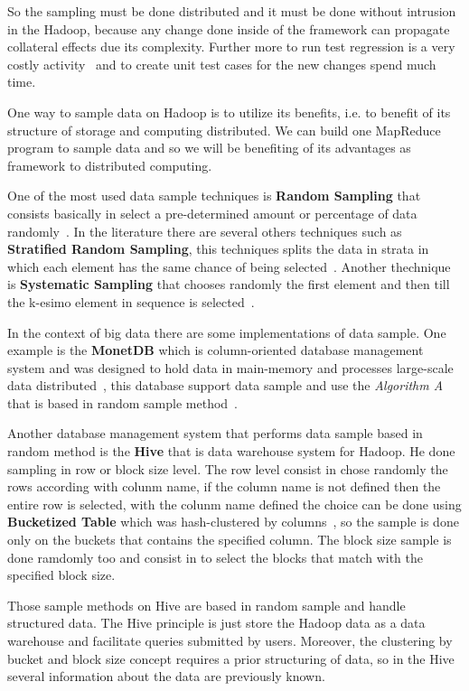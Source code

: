 So the sampling must be done distributed and it must be done without intrusion
in the Hadoop, because any change done inside of the framework can propagate collateral
effects due its complexity. Further more to run test regression is a very costly
activity~\cite{hadoopUnit} and to create unit test cases for the new changes spend
much time.

One way to sample data on Hadoop is to utilize its benefits, i.e. to benefit of
its structure of storage and computing distributed. We can build one MapReduce
program to sample data and so we will be benefiting of its advantages as framework
to distributed computing.

One of the most used data sample techniques is {\bf Random Sampling} that consists
basically in select a pre-determined amount or percentage of data randomly~\cite{randomsampling}.
In the literature there are several others techniques such as {\bf Stratified Random Sampling},
this techniques splits the data in strata in which each element has the same chance
of being selected~\cite{randomsampling}. Another thechnique is {\bf Systematic Sampling}
that chooses randomly the first element and then till the k-esimo element in sequence
is selected~\cite{systematicsampling}.

In the context of big data there are some implementations of data sample. One example
is the {\bf MonetDB} which is column-oriented database management system and was
designed to hold data in main-memory and processes large-scale data distributed~\cite{monetDB},
this database support data sample and use the {\it Algorithm A} that is based in
random sample method~\cite{vitter:1984}.

Another database management system that performs data sample based in random method
is the {\bf Hive} that is data warehouse system for Hadoop. He done sampling in
row or block size level. The row level consist in chose randomly the rows
according with colunm name, if the column name is not defined then the entire row
is selected, with the colunm name defined the choice can be done using
{\bf Bucketized Table} which was hash-clustered by columns~\cite{hiveSample},
so the sample is done only on the buckets that contains the specified column. 
The block size sample is done ramdomly too and consist in to select the blocks that
match with the specified block size.

Those sample methods on Hive are based in random sample and handle structured data.
The Hive principle is just store the Hadoop data as a data warehouse and facilitate
queries submitted by users. Moreover, the clustering by bucket and block size concept requires a
prior structuring of data, so in the Hive several information about the data are
previously known.

